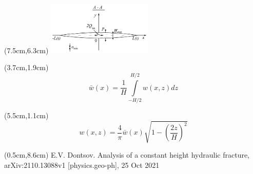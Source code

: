 \documentclass{beamer}
\begin{document}
\begin{frame}
\begin{textblock*}{7cm}(7.5cm,6.3cm)
\includegraphics[width=5cm]{pkn_model_A-A_plane.jpg}
\end{textblock*}

\begin{textblock*}{3.7cm}(3.7cm,1.9cm)
\tiny
$$
\boxed{
\bar{w}(x)=\frac{1}{H}\!\int\limits_{-H/2}^{H/2}{w(x,z)dz}
}
$$
\end{textblock*}

\begin{textblock*}{7cm}(5.5cm,1.1cm)
\tiny
$$
\boxed{
w(x,z)=\frac{4}{\pi}\bar{w}(x)\sqrt{1-\left(\frac{2z}{H}\right)^2}
}
$$
\end{textblock*}

\begin{textblock*}{7cm}(0.5cm,8.6cm)
\scriptsize
\textcolor{lit_gray}{E.V. Dontsov. Analysis of a constant height hydraulic fracture, arXiv:2110.13088v1 [physics.geo-ph], 25 Oct 2021}
\end{textblock*}

\normalsize

\end{frame}
\end{document}
